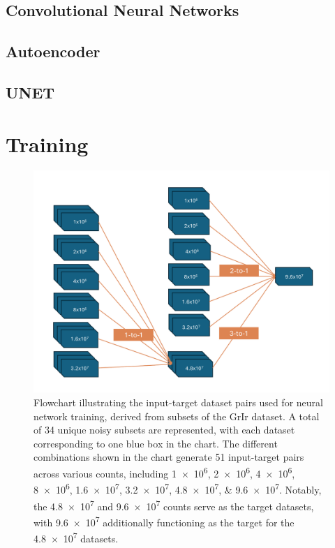\subsection{Convolutional Neural Networks}
\subsection{Autoencoder}
\cite{goodfellowDeepLearning2016}
\subsection{UNET}



\section{Training}

\begin{figure}[h]
    \centering
    \includegraphics[width=1\linewidth]{images/training_flowchart.pdf}
    \caption{Flowchart illustrating the input-target dataset pairs used for neural network training, derived from subsets of the \gls{GrIr} dataset. A total of \num{34} unique noisy subsets are represented, with each dataset corresponding to one blue box in the chart. The different combinations shown in the chart generate \num{51} input-target pairs across various counts, including \numlist{1e6;2e6;4e6;8e6;1.6e7;3.2e7;4.8e7;9.6e7}. Notably, the \num{4.8e7} and \num{9.6e7} counts serve as the target datasets, with \num{9.6e7} additionally functioning as the target for the \num{4.8e7} datasets.}
    \label{fig:training-data}
\end{figure}


